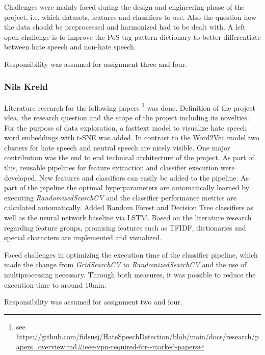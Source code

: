 Challenges were mainly faced during the design and engineering phase of the project, i.e. which datasets, features and classifiers to use. Also the question how the data should be preprocessed and harmonized had to be dealt with. A left open challenge is to improve the PoS-tag pattern dictionary to better differentiate between hate speech and non-hate speech. 

Responsibility was assumed for assignment three and four.

\subsubsection*{Nils Krehl}

Literature research for the following papers \footnote{see \url{https://github.com/fidsusj/HateSpeechDetection/blob/main/docs/research/papers_overview.md\#ieee-vpn-required-for--marked-papers}} was done.
Definition of the project idea, the research question and the scope of the project including its novelties. 
For the purpose of data exploration, a fasttext model to visualize hate speech word embeddings with t-SNE was added. In contrast to the Word2Vec model two clusters for hate speech and neutral speech are nicely visible.
One major contribution was the end to end technical architecture of the project. As part of this, reusable pipelines for feature extraction and classifier execution were developed. New features and classifiers can easily be added to the pipeline. As part of the pipeline the optimal hy\-per\-pa\-ra\-me\-ters are automatically learned by executing \textit{RandomizedSearchCV} and the classifier performance metrics are calculated automatically. Added Random Forest and Decision Tree classifiers as well as the neural network baseline via LSTM. 
Based on the literature research regarding feature groups, promising features such as TFIDF, dictionaries and special characters are implemented and visualized.

Faced challenges in optimizing the execution time of the classifier pipeline, which made the change from \textit{GridSearchCV} to \textit{RandomizedSearchCV} and the use of multiprocessing necessary. Through both measures, it was possible to reduce the execution time to around 10min.

Responsibility was assumed for assignment two and four.
